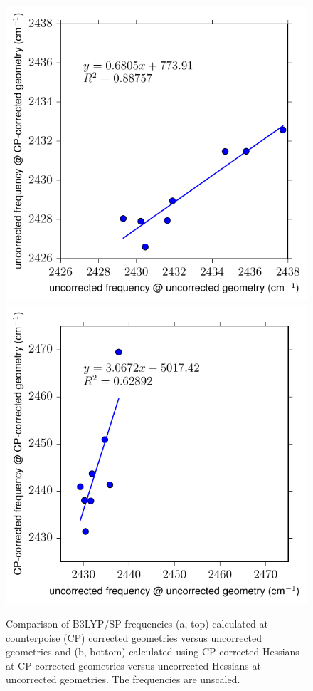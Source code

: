 \begin{figure}
  \centering
  \includegraphics[scale=0.91]{paper_02/Fig3a.pdf}
  \includegraphics[scale=0.91]{paper_02/Fig3b.pdf}
  \caption[Correlation of \texorpdfstring{ \(\nu_3\)}{carbon dioxide asymmetric stretch} frequencies with CP corrections]{Comparison of B3LYP/SP frequencies (a, top) calculated at counterpoise (CP) corrected geometries versus uncorrected geometries and (b, bottom) calculated using CP-corrected Hessians at CP-corrected geometries versus uncorrected Hessians at uncorrected geometries. The frequencies are unscaled.}
  \label{paper_02:fig:3}
\end{figure}

